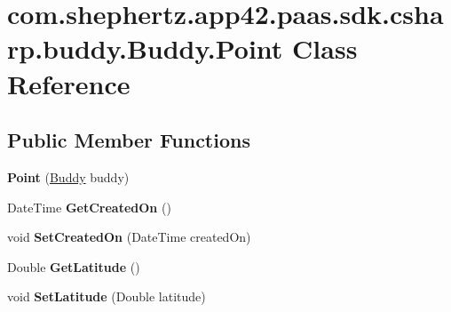 \hypertarget{classcom_1_1shephertz_1_1app42_1_1paas_1_1sdk_1_1csharp_1_1buddy_1_1_buddy_1_1_point}{\section{com.\+shephertz.\+app42.\+paas.\+sdk.\+csharp.\+buddy.\+Buddy.\+Point Class Reference}
\label{classcom_1_1shephertz_1_1app42_1_1paas_1_1sdk_1_1csharp_1_1buddy_1_1_buddy_1_1_point}
}
\subsection*{Public Member Functions}
\begin{DoxyCompactItemize}
\item 
\hypertarget{classcom_1_1shephertz_1_1app42_1_1paas_1_1sdk_1_1csharp_1_1buddy_1_1_buddy_1_1_point_a4bc9546f399e41e2b48c2a4d08a35119}{{\bfseries Point} (\hyperlink{classcom_1_1shephertz_1_1app42_1_1paas_1_1sdk_1_1csharp_1_1buddy_1_1_buddy}{Buddy} buddy)}\label{classcom_1_1shephertz_1_1app42_1_1paas_1_1sdk_1_1csharp_1_1buddy_1_1_buddy_1_1_point_a4bc9546f399e41e2b48c2a4d08a35119}

\item 
\hypertarget{classcom_1_1shephertz_1_1app42_1_1paas_1_1sdk_1_1csharp_1_1buddy_1_1_buddy_1_1_point_a4f6f01d42125481772a30d6a0d672ccc}{Date\+Time {\bfseries Get\+Created\+On} ()}\label{classcom_1_1shephertz_1_1app42_1_1paas_1_1sdk_1_1csharp_1_1buddy_1_1_buddy_1_1_point_a4f6f01d42125481772a30d6a0d672ccc}

\item 
\hypertarget{classcom_1_1shephertz_1_1app42_1_1paas_1_1sdk_1_1csharp_1_1buddy_1_1_buddy_1_1_point_a0760281185105efb448933da2c01549d}{void {\bfseries Set\+Created\+On} (Date\+Time created\+On)}\label{classcom_1_1shephertz_1_1app42_1_1paas_1_1sdk_1_1csharp_1_1buddy_1_1_buddy_1_1_point_a0760281185105efb448933da2c01549d}

\item 
\hypertarget{classcom_1_1shephertz_1_1app42_1_1paas_1_1sdk_1_1csharp_1_1buddy_1_1_buddy_1_1_point_a3b7464704bb0b6319596c2e5d2df4975}{Double {\bfseries Get\+Latitude} ()}\label{classcom_1_1shephertz_1_1app42_1_1paas_1_1sdk_1_1csharp_1_1buddy_1_1_buddy_1_1_point_a3b7464704bb0b6319596c2e5d2df4975}

\item 
\hypertarget{classcom_1_1shephertz_1_1app42_1_1paas_1_1sdk_1_1csharp_1_1buddy_1_1_buddy_1_1_point_a06490115844ce7899057c93f2079d791}{void {\bfseries Set\+Latitude} (Double latitude)}\label{classcom_1_1shephertz_1_1app42_1_1paas_1_1sdk_1_1csharp_1_1buddy_1_1_buddy_1_1_point_a06490115844ce7899057c93f2079d791}


\end{DoxyCompactItemize}
